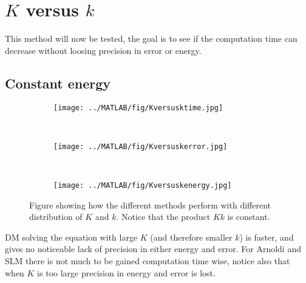 \section{$K$ versus $k$}%


This method will now be tested, the goal is to see if the computation time can decrease without loosing precision in error or energy.

\subsection{Constant energy}%
\begin{figure}[H]
        \centering
        \begin{subfigure}[b]{0.3\textwidth}
                \texttt{[image: ../MATLAB/fig/Kversusktime.jpg]}
                \caption{  }
                \label{fig:Kversusktime}
        \end{subfigure}
        ~
        \begin{subfigure}[b]{0.3\textwidth}
                \texttt{[image: ../MATLAB/fig/Kversuskerror.jpg]}
                \caption{  }
                \label{fig:Kversuskerror}
        \end{subfigure}
        ~
        \begin{subfigure}[b]{0.3\textwidth}
                \texttt{[image: ../MATLAB/fig/Kversuskenergy.jpg]}
                \caption{  }
                \label{fig:Kversuskenergy}
        \end{subfigure}
        \caption{Figure showing how the different methods perform with different distribution of $K$ and $k$. Notice that the product $Kk$ is constant. }
        \label{fig:Kversusk}
\end{figure}
DM solving the equation with large $K$ (and therefore smaller $k$) is faster, and gives no noticeable lack of precision in either energy and error. For Arnoldi and SLM there is not much to be gained computation time wise, notice also that when $K$ is too large precision in energy and error is lost.

